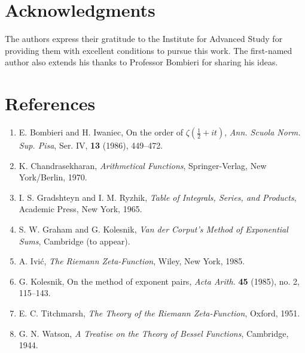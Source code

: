 \documentclass[10pt]{article}
\begin{document}
\section*{Acknowledgments}
The authors express their gratitude to the Institute for Advanced Study for providing them with excellent conditions to pursue this work. The first-named author also extends his thanks to Professor Bombieri for sharing his ideas.

\section*{References}
\begin{enumerate}
  \item E. Bombieri and H. Iwaniec, On the order of $\zeta(\tfrac12+it)$, \textit{Ann. Scuola Norm. Sup. Pisa}, Ser. IV, \textbf{13} (1986), 449--472.
  \item K. Chandrasekharan, \textit{Arithmetical Functions}, Springer-Verlag, New York/Berlin, 1970.
  \item I. S. Gradshteyn and I. M. Ryzhik, \textit{Table of Integrals, Series, and Products}, Academic Press, New York, 1965.
  \item S. W. Graham and G. Kolesnik, \textit{Van der Corput's Method of Exponential Sums}, Cambridge (to appear).
  \item A. Ivić, \textit{The Riemann Zeta-Function}, Wiley, New York, 1985.
  \item G. Kolesnik, On the method of exponent pairs, \textit{Acta Arith.} \textbf{45} (1985), no. 2, 115--143.
  \item E. C. Titchmarsh, \textit{The Theory of the Riemann Zeta-Function}, Oxford, 1951.
  \item G. N. Watson, \textit{A Treatise on the Theory of Bessel Functions}, Cambridge, 1944.
\end{enumerate}
\end{document}
